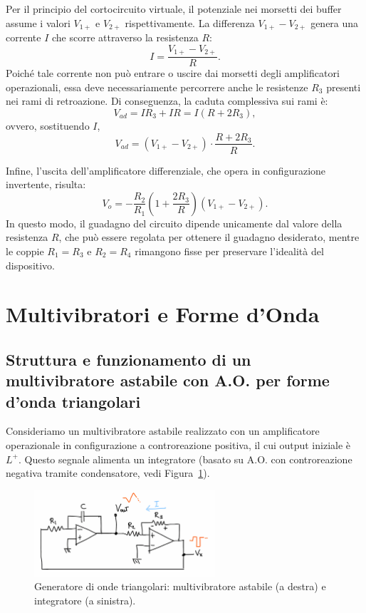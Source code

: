 Per il principio del cortocircuito virtuale, il potenziale nei morsetti dei buffer assume i valori \(V_{1+}\) e \(V_{2+}\) rispettivamente. La differenza \(V_{1+} - V_{2+}\) genera una corrente \(I\) che scorre attraverso la resistenza \(R\):
\[
I = \frac{V_{1+} - V_{2+}}{R}.
\]
Poiché tale corrente non può entrare o uscire dai morsetti degli amplificatori operazionali, essa deve necessariamente percorrere anche le resistenze \(R_3\) presenti nei rami di retroazione. Di conseguenza, la caduta complessiva sui rami è:
\[
V_{ad} = I R_3 + I R = I (R + 2R_3),
\]
ovvero, sostituendo \(I\),
\[
V_{ad} = (V_{1+} - V_{2+}) \cdot \frac{R + 2R_3}{R}.
\]

Infine, l’uscita dell’amplificatore differenziale, che opera in configurazione invertente, risulta:
\[
V_o = -\frac{R_2}{R_1} \left( 1 + \frac{2R_3}{R} \right) (V_{1+} - V_{2+}).
\]
In questo modo, il guadagno del circuito dipende unicamente dal valore della resistenza \(R\), che può essere regolata per ottenere il guadagno desiderato, mentre le coppie \(R_1 = R_3\) e \(R_2 = R_4\) rimangono fisse per preservare l’idealità del dispositivo.

\newpage
\section{Multivibratori e Forme d’Onda}

\subsection{Struttura e funzionamento di un multivibratore astabile con A.O. per forme d’onda triangolari}

Consideriamo un multivibratore astabile realizzato con un amplificatore operazionale in configurazione a controreazione positiva, il cui output iniziale è \(L^+\). Questo segnale alimenta un integratore (basato su A.O. con controreazione negativa tramite condensatore, vedi Figura~\ref{fig:onda_triangolare}).\\[2mm]
\begin{figure}[H]
    \centering
    \includegraphics[width=0.6\textwidth]{images/1.6.1.1.png}
    \caption{Generatore di onde triangolari: multivibratore astabile (a destra) e integratore (a sinistra).}
    \label{fig:onda_triangolare}
\end{figure}

